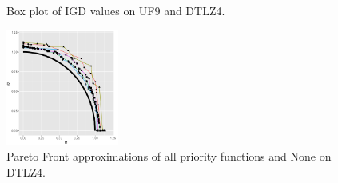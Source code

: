 \begin{figure}[!t]
\begin{subfigure}[b]{0.33\textwidth}
	\end{subfigure}
	\caption{Box plot of IGD values on UF9 and DTLZ4.}
		\label{IGDS}
\end{figure}


%
%

\begin{figure}[!t]

	\centering
	\includegraphics[width=0.33\textwidth, height=0.33\textwidth]{images/Pareto-front-dtlz4.png}
	\caption{Pareto Front approximations of all priority functions and None on DTLZ4.}
	\label{PFs}

\end{figure}

